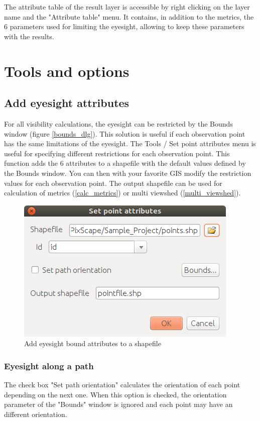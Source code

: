 \documentclass{report}
\begin{document}
The attribute table of the result layer is accessible by right clicking on the layer name and the "Attribute table" menu. It contains, in addition to the metrics, the 6 parameters used for limiting the eyesight, allowing to keep these parameters with the results.

\section{Tools and options}
\label{tools}

\subsection{Add eyesight attributes}
\label{add_attributes}
For all visibility calculations, the eyesight can be restricted by the Bounds window (figure \ref{bounds_dlg}). This solution is useful if each observation point has the same limitations of the eyesight.
The Tools / Set point attributes menu is useful for specifying different restrictions for each observation point. This function adds the 6 attributes to a shapefile with the default values defined by the Bounds window. You can then with your favorite GIS modify the restriction values for each observation point.
The output shapefile can be used for calculation of metrics (\ref{calc_metrics}) or multi viewshed (\ref{multi_viewshed}).

\begin{figure}[H]
	\includegraphics[scale=0.5]{img/add_attributes-en.png} 
	\caption{Add eyesight bound attributes to a shapefile}
	\label{add_attributes_dlg}
\end{figure}

\subsubsection{Eyesight along a path}
The check box "Set path orientation" calculates  the orientation of each point depending on the next one. When this option is checked, the orientation parameter of the "Bounds" window is ignored and each point may have an different orientation.
\end{document}
